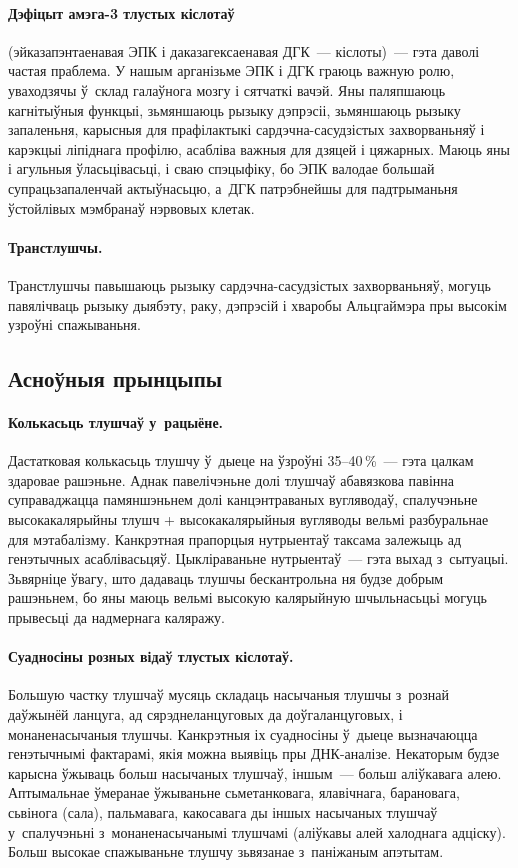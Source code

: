 \paragraph{Дэфіцыт амэга-3 тлустых кіслотаў} (эйказапэнтаенавая ЭПК і даказагексаенавая ДГК~--- кіслоты)~--- гэта даволі частая праблема.
У нашым арганізьме ЭПК і ДГК граюць важную ролю, уваходзячы ў~склад галаўнога мозгу і сятчаткі вачэй. Яны паляпшаюць кагнітыўныя функцыі, зьмяншаюць рызыку дэпрэсіі, зьмяншаюць рызыку запаленьня, карысныя для прафілактыкі сардэчна-сасудзістых захворваньняў і карэкцыі ліпіднага профілю, асабліва важныя для дзяцей і цяжарных. Маюць яны і агульныя ўласьцівасьці, і сваю спэцыфіку, бо ЭПК валодае большай супрацьзапаленчай актыўнасьцю, а~ДГК патрэбнейшы для падтрыманьня ўстойлівых мэмбранаў нэрвовых клетак.

\paragraph{Транстлушчы.}
Транстлушчы павышаюць рызыку сардэчна-сасудзістых захворваньняў, могуць павялічваць рызыку дыябэту, раку, дэпрэсій і хваробы Альцгаймэра пры высокім узроўні спажываньня.

\subsection{Асноўныя прынцыпы}

\paragraph{Колькасьць тлушчаў у~рацыёне.}
Дастатковая колькасьць тлушчу ў~дыеце на ўзроўні 35--40\,\%~--- гэта цалкам здаровае рашэньне. Аднак павелічэньне долі тлушчаў абавязкова павінна суправаджацца памяншэньнем долі канцэнтраваных вугляводаў, спалучэньне высокакалярыйны тлушч + высокакалярыйныя вугляводы вельмі разбуральнае для мэтабалізму. Канкрэтная прапорцыя нутрыентаў таксама залежыць ад генэтычных асаблівасьцяў. Цыкліраваньне нутрыентаў~--- гэта выхад з~сытуацыі. Зьвярніце ўвагу, што дадаваць тлушчы бескантрольна ня будзе добрым рашэньнем, бо яны маюць вельмі высокую калярыйную шчыльнасьцьі могуць прывесьці да надмернага каляражу.

\paragraph{Суадносіны розных відаў тлустых кіслотаў.}
Большую частку тлушчаў мусяць складаць насычаныя тлушчы з~рознай даўжынёй ланцуга, ад сярэднеланцуговых да доўгаланцуговых, і монаненасычаныя тлушчы. Канкрэтныя іх суадносіны ў~дыеце вызначаюцца генэтычнымі фактарамі, якія можна выявіць пры ДНК-аналізе. Некаторым будзе карысна ўжываць больш насычаных тлушчаў, іншым~--- больш аліўкавага алею. Аптымальнае ўмеранае ўжываньне сьметанковага, ялавічнага, барановага, сьвінога (сала), пальмавага, какосавага ды іншых насычаных тлушчаў у~спалучэньні з~монаненасычанымі тлушчамі (аліўкавы алей халоднага адціску). Больш высокае спажываньне тлушчу зьвязанае з~паніжаным апэтытам.

